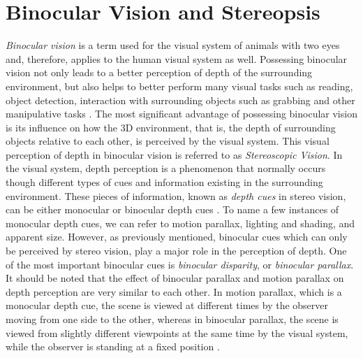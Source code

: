 \chapter{Binocular Vision and Stereopsis}
\label{chap:BinocularVision}

\textit{Binocular vision} is a term used for the visual system of animals with two eyes \cite{how95} and, therefore, applies to the human visual system as well. 
Possessing binocular vision not only leads to a better perception of depth
of the surrounding environment, but also helps to better perform many visual tasks such as reading, object detection, interaction with surrounding objects such as grabbing and other manipulative 
tasks \cite{how95}. The most significant advantage of possessing binocular vision is its influence on how the 3D environment, that is, the 
depth of surrounding objects relative to each other, 
is perceived by the visual system. This visual perception of depth in binocular vision is referred to as {\it Stereoscopic Vision}.
In the visual system, depth perception is a phenomenon that normally occurs though different types of cues and information existing in the surrounding environment. 
These pieces of information, known as {\it depth cues} in stereo vision, can be either monocular or binocular depth cues \cite{how95}.
To name a few instances of monocular depth cues, we can refer to motion parallax, lighting and shading, and apparent size. 
However, as previously mentioned, binocular cues which can only be perceived
by stereo vision, play a major role in the perception of depth. One of the most important binocular cues is {\it binocular disparity}, or {\it binocular parallax}. 
It should be noted that the effect of binocular parallax and motion parallax on depth perception are very similar to each other. 
In motion parallax, which is a monocular depth cue, the scene is viewed at different times by the observer moving from one side to the other, 
whereas in binocular parallax, the scene is viewed from slightly different viewpoints at
the same time by the visual system, while the observer is standing at a fixed position \cite{how95}.

